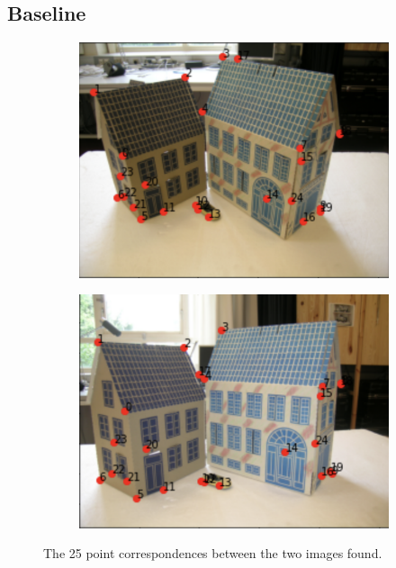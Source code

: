 \subsection{Baseline}
\begin{figure}[h]
	\centering
	\begin{subfigure}{0.48\linewidth}
		\centering
		\includegraphics[width=\linewidth]{Materials/BaselineA}
	\end{subfigure}
	\hfill
	\begin{subfigure}{0.48\linewidth}
		\centering
		\includegraphics[width=\linewidth]{Materials/BaselineB}
	\end{subfigure}
	\caption{The 25 point correspondences between the two images found.}
	\label{correspondences}
\end{figure}
